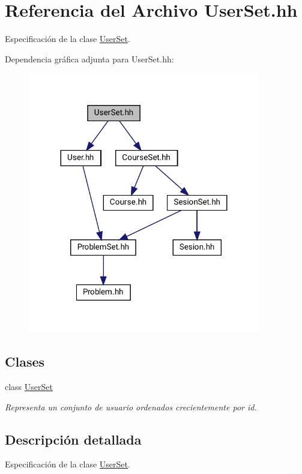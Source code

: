 \hypertarget{_user_set_8hh}{}\section{Referencia del Archivo User\+Set.\+hh}
\label{_user_set_8hh}


Especificación de la clase \mbox{\hyperlink{class_user_set}{User\+Set}}.  


Dependencia gráfica adjunta para User\+Set.\+hh\+:\nopagebreak
\begin{figure}[H]
\begin{center}
\leavevmode
\includegraphics[width=287pt]{_user_set_8hh__incl}
\end{center}
\end{figure}
\subsection*{Clases}
\begin{DoxyCompactItemize}
\item 
class \mbox{\hyperlink{class_user_set}{User\+Set}}
\begin{DoxyCompactList}\small\item\em Representa un conjunto de usuario ordenados crecientemente por id. \end{DoxyCompactList}\end{DoxyCompactItemize}


\subsection{Descripción detallada}
Especificación de la clase \mbox{\hyperlink{class_user_set}{User\+Set}}. 

